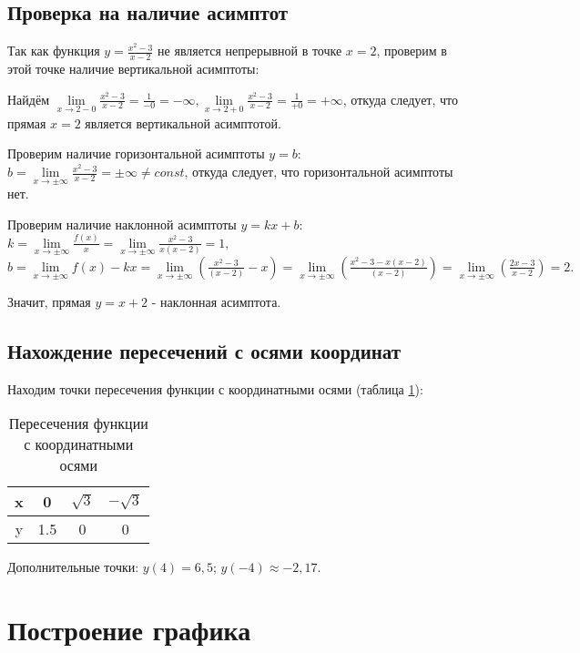 \subsection{Проверка на наличие асимптот}

Так как функция $y = \frac{x^2-3}{x-2}$ не является непрерывной в точке $x = 2$, проверим в этой точке наличие вертикальной асимптоты:

Найдём $\lim\limits_{x\to 2-0} \frac{x^2-3}{x-2} = \frac{1}{-0} = -\infty, \lim\limits_{x\to 2+0} \frac{x^2-3}{x-2} = \frac{1}{+0} = +\infty$, откуда следует, что прямая $x = 2$ является вертикальной асимптотой.

Проверим наличие горизонтальной асимптоты $y = b$: $b = \lim\limits_{x\to \pm \infty} \frac{x^2-3}{x-2} =  \pm \infty \neq const$, откуда следует, что горизонтальной асимптоты нет.

Проверим наличие наклонной асимптоты $y = kx + b$: $k = \lim\limits_{x\to \pm \infty} \frac{f(x)}{x} = \lim\limits_{x\to \pm \infty} \frac{x^2-3}{x(x-2)} = 1,$ $b = \lim\limits_{x\to \pm \infty} f(x) - kx = \lim\limits_{x\to \pm \infty} (\frac{x^2-3}{(x-2)}-x) = \lim\limits_{x\to \pm \infty} (\frac{x^2-3-x(x-2)}{(x-2)}) = \lim\limits_{x\to \pm \infty}(\frac{2x-3}{x-2}) = 2.$

Значит, прямая $y = x + 2$ - наклонная асимптота.

\subsection{Нахождение пересечений с осями координат}

Находим точки пересечения функции с координатными осями (таблица \ref{tabular:tab1}): 

\begin{table}[H]
	\caption{Пересечения функции с координатными осями}
	\begin{center}
		\begin{tabular}{|c|c|c|c|}
			\hline
			x & 0 & $\sqrt{3}$ & $-\sqrt{3}$ \\ \hline
			y & 1.5 & 0 & 0 \\ \hline
		\end{tabular}
		\label{tabular:tab1}
	\end{center}
\end{table}

Дополнительные точки: $y(4) = 6,5$; $y(-4) \approx -2,17.$


\section{Построение графика}
